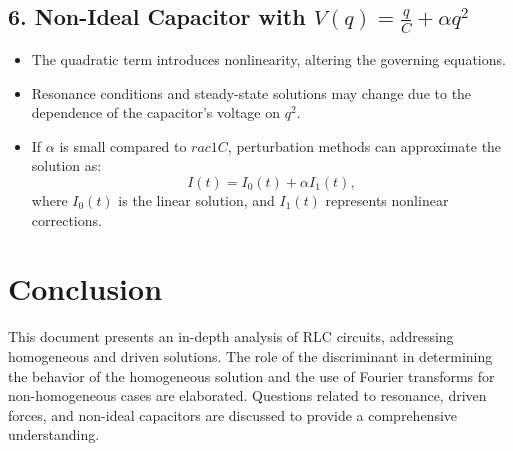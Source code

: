 \documentclass[a4paper,11pt]{article}
\begin{document}
\subsection*{6. Non-Ideal Capacitor with \(V(q) = \frac{q}{C} + \alpha q^2\)}
\begin{itemize}
    \item The quadratic term introduces nonlinearity, altering the governing equations.
    \item Resonance conditions and steady-state solutions may change due to the dependence of the capacitor's voltage on \(q^2\).
    \item If \(\alpha\) is small compared to \(rac{1}{C}\), perturbation methods can approximate the solution as:
    \[
    I(t) = I_0(t) + \alpha I_1(t),
    \]
    where \(I_0(t)\) is the linear solution, and \(I_1(t)\) represents nonlinear corrections.
\end{itemize}

\section*{Conclusion}
This document presents an in-depth analysis of RLC circuits, addressing homogeneous and driven solutions. The role of the discriminant in determining the behavior of the homogeneous solution and the use of Fourier transforms for non-homogeneous cases are elaborated. Questions related to resonance, driven forces, and non-ideal capacitors are discussed to provide a comprehensive understanding.
\end{document}
